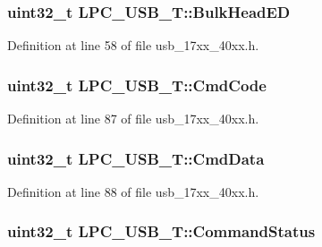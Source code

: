 \subsubsection[{\texorpdfstring{Bulk\+Head\+ED}{BulkHeadED}}]{ uint32\+\_\+t L\+P\+C\+\_\+\+U\+S\+B\+\_\+\+T\+::\+Bulk\+Head\+ED}\hypertarget{structLPC__USB__T_ac14ba1ced21f63a4d4cbdc080b17b776}{}\label{structLPC__USB__T_ac14ba1ced21f63a4d4cbdc080b17b776}


Definition at line 58 of file usb\+\_\+17xx\+\_\+40xx.\+h.

\subsubsection[{\texorpdfstring{Cmd\+Code}{CmdCode}}]{ uint32\+\_\+t L\+P\+C\+\_\+\+U\+S\+B\+\_\+\+T\+::\+Cmd\+Code}\hypertarget{structLPC__USB__T_a37890dcf58466be405c70eee3fbd7eec}{}\label{structLPC__USB__T_a37890dcf58466be405c70eee3fbd7eec}


Definition at line 87 of file usb\+\_\+17xx\+\_\+40xx.\+h.

\subsubsection[{\texorpdfstring{Cmd\+Data}{CmdData}}]{ uint32\+\_\+t L\+P\+C\+\_\+\+U\+S\+B\+\_\+\+T\+::\+Cmd\+Data}\hypertarget{structLPC__USB__T_afdd250b8fb3c6fe4d926313eb4e624b9}{}\label{structLPC__USB__T_afdd250b8fb3c6fe4d926313eb4e624b9}


Definition at line 88 of file usb\+\_\+17xx\+\_\+40xx.\+h.

\subsubsection[{\texorpdfstring{Command\+Status}{CommandStatus}}]{ uint32\+\_\+t L\+P\+C\+\_\+\+U\+S\+B\+\_\+\+T\+::\+Command\+Status}\hypertarget{structLPC__USB__T_a5f3bd378763d0743ce57e6addf75e81d}{}\label{structLPC__USB__T_a5f3bd378763d0743ce57e6addf75e81d}


